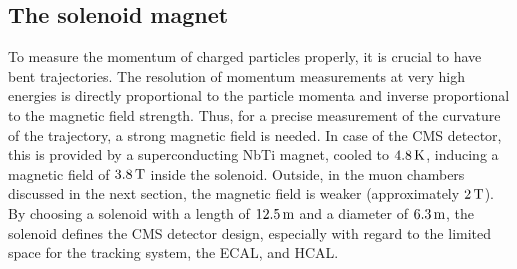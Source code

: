 \subsection{The solenoid magnet}
To measure the momentum of charged particles properly, it is crucial to have bent trajectories. The resolution of momentum measurements at very high energies is directly proportional to the particle momenta and inverse proportional to the magnetic field strength. Thus, for a precise measurement of the curvature of the trajectory, a strong magnetic field is needed. In case of the CMS detector, this is provided by a superconducting NbTi magnet, cooled to $4.8\,\text{K}$, inducing a magnetic field of $3.8\,\text{T}$ inside the solenoid. Outside, in the muon chambers discussed in the next section, the magnetic field is weaker (approximately $2\,\text{T}$). By choosing a solenoid with a length of $12.5\,\text{m}$ and a diameter of $6.3\,\text{m}$, the solenoid defines the CMS detector design, especially with regard to the limited space for the tracking system, the ECAL, and HCAL.



